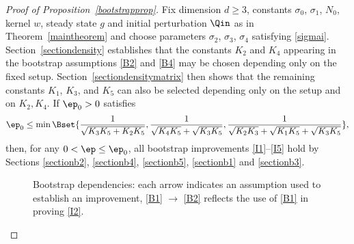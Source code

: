 \begin{proof}[Proof of Proposition~\ref{bootstrapprop}]
Fix dimension $d\geq 3$, constants $\sigma_0$, $\sigma_1$, $N_0$, kernel $w$, steady state $g$ and initial perturbation $\Qin$ as in Theorem~\ref{maintheorem} and choose parameters $\sigma_2$, $\sigma_3$, $\sigma_4$ satisfying \eqref{sigmai}. Section~\ref{sectiondensity} establishes that the constants $K_2$ and $K_4$ appearing in the bootstrap assumptions \eqref{B2} and \eqref{B4} may be chosen depending only on the fixed setup. Section~\ref{sectiondensitymatrix} then shows that the remaining constants $K_1$, $K_3$, and $K_5$ can also be selected depending only on the setup and on $K_2, K_4$. If $\ep_0>0$ satisfies
\begin{align*}
\ep_0\leq\min\Bset{\frac{1}{\sqrt{K_3K_5+K_2K_5}},\frac{1}{\sqrt{K_4K_5}+\sqrt{K_3K_5}},\frac{1}{\sqrt{K_2K_3}+\sqrt{K_1K_5}+\sqrt{K_3K_5}}},
\end{align*}
then, for any $0<\ep\leq \ep_0$, all bootstrap improvements \eqref{I1}--\eqref{I5} hold by Sections \ref{sectionb2}, \ref{sectionb4}, \ref{sectionb5}, \ref{sectionb1} and \ref{sectionb3}.

\begin{figure}[ht]
\centering
{}
\captionsetup{width=.7\linewidth}
\caption{Bootstrap dependencies: each arrow indicates an assumption used to establish an improvement, \eg \eqref{B1} $\rightarrow$ \eqref{B2} reflects the use of \eqref{B1} in proving \eqref{I2}.}


\end{figure}
\end{proof}
